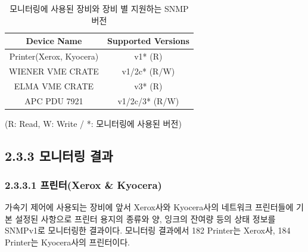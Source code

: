 \documentclass[11pt
  , a4paper
  , article
  , oneside
]{memoir}
\begin{document}
\begin{table}[h]
\begin{center}
\begin{tabular}{c|c}\hline
Device Name & Supported Versions \\ \hline
Printer(Xerox, Kyocera) & v1* (R) \\ \hline
WIENER VME CRATE & v1/2c* (R/W) \\ \hline
ELMA VME CRATE & v3* (R) \\ \hline
APC PDU 7921 & v1/2c/3* (R/W) \\ \hline
\end{tabular}
\caption{모니터링에 사용된 장비와 장비 별 지원하는 SNMP 버전}
{(R: Read, W: Write / *: 모니터링에 사용된 버전)}
  \label{table:used_version}  
\end{center}
\end{table} 

\clearpage
\subsection{2.3.3 모니터링 결과}
\subsubsection{2.3.3.1 프린터(Xerox \& Kyocera)}

가속기 제어에 사용되는 장비에 앞서 Xerox사와 Kyocera사의 네트워크 프린터들에 기본 설정된 사항으로 프린터 용지의 종류와 양, 잉크의 잔여량 등의 상태 정보를 SNMPv1로 모니터링한 결과이다. 모니터링 결과에서 182 Printer는 Xerox사, 184 Printer는 Kyocera사의 프린터이다.
\end{document}

